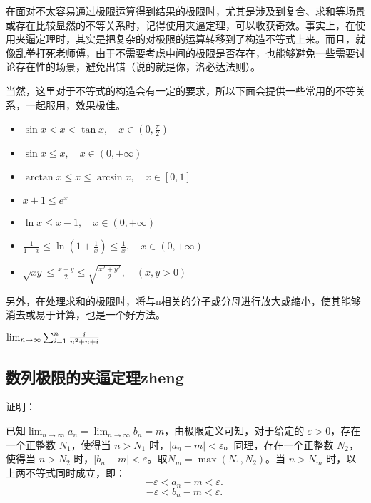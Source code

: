 在面对不太容易通过极限运算得到结果的极限时，尤其是涉及到复合、求和等场景或存在比较显然的不等关系时，记得使用夹逼定理，可以收获奇效。事实上，在使用夹逼定理时，其实是把复杂的对极限的运算转移到了构造不等式上来。而且，就像乱拳打死老师傅，由于不需要考虑中间的极限是否存在，也能够避免一些需要讨论存在性的场景，避免出错（说的就是你，洛必达法则）。

当然，这里对于不等式的构造会有一定的要求，所以下面会提供一些常用的不等关系，一起服用，效果极佳。

\begin{itemize}
\item $\sin x < x < \tan x, \quad x \in \left(0, \frac{\pi}{2}\right)$
\item $\sin x \leq x, \quad x \in (0, +\infty)$
\item $\arctan x \leq x \leq \arcsin x, \quad x \in [0, 1] $
\item $x + 1\leq e^x$
\item $\ln x\leq x - 1 , \quad x \in (0, +\infty)$
\item $\frac{1}{1 + x} \leq \ln\left(1 + \frac{1}{x}\right) \leq \frac{1}{x}, \quad x \in (0, +\infty)$
\item $\sqrt{xy} \leq \frac{x + y}{2} \leq \sqrt{\frac{x^2 + y^2}{2}}, \quad (x, y > 0)$
\end{itemize}

\begin{example}{}

\end{example}
另外，在处理求和的极限时，将与n相关的分子或分母进行放大或缩小，使其能够消去或易于计算，也是一个好方法。
\begin{example}{$\lim_{n\to \infty}\sum_{i=1}^n{i\over n^2+n+i}$}
\end{example}

\subsection{数列极限的夹逼定理zheng}


证明：

已知$\lim_{n \to \infty} a_n = \lim_{n \to \infty} b_n = m$，由极限定义可知，对于给定的 $\varepsilon > 0$，存在一个正整数 $N_1$，使得当 $n > N_1$ 时，$|a_n - m| < \varepsilon$。同理，存在一个正整数 $N_2$，使得当 $n > N_2$ 时，$|b_n - m| < \varepsilon$。取$N_m = \max(N_1, N_2)$。当 $n > N_m$ 时，以上两不等式同时成立，即：
\begin{equation}
- \varepsilon < a_n-m <\varepsilon.~
\end{equation}
\begin{equation}
-\varepsilon < b_n-m <\varepsilon.~
\end{equation}

